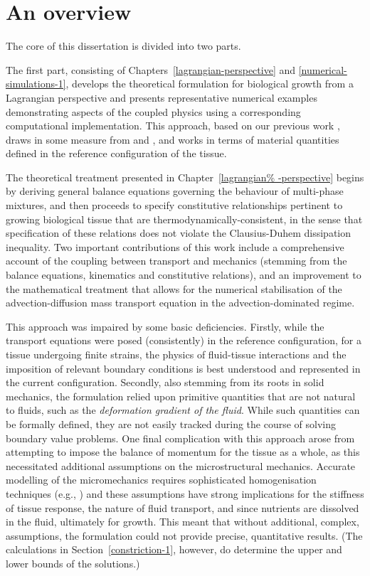 \section{An overview}
\label{overview}

The core of this dissertation is divided into two parts.

The first part, consisting of Chapters~\ref{lagrangian-perspective}
and \ref{numerical-simulations-1}, develops the theoretical
formulation for biological growth from a Lagrangian perspective and
presents representative numerical examples demonstrating aspects of
the coupled physics using a corresponding computational
implementation. This approach, based on our previous work
\citep{growthpaper}, draws in some measure from
\citet{CowinHegedus:76, EpsteinMaugin:2000} and
\citet{TaberHumphrey:2001}, and works in terms of material quantities
defined in the reference configuration of the tissue.

The theoretical treatment presented in Chapter~\ref{lagrangian%
  -perspective} begins by deriving general balance equations governing
the behaviour of multi-phase mixtures, and then proceeds to specify
constitutive relationships pertinent to growing biological tissue that
are thermody\-namically-consistent, in the sense that specification of
these relations does not violate the Clausius-Duhem dissipation
inequality. Two important contributions of this work include a
comprehensive account of the coupling between transport and mechanics
(stemming from the balance equations, kinematics and constitutive
relations), and an improvement to the mathematical treatment that
allows for the numerical stabilisation of the advection-diffusion mass
transport equation in the advection-dominated regime.

This approach was impaired by some basic deficiencies. Firstly, while
the transport equations were posed (consistently) in the reference
configuration, for a tissue undergoing finite strains, the physics of
fluid-tissue interactions and the imposition of relevant boundary
conditions is best understood and represented in the current
configuration.  Secondly, also stemming from its roots in solid
mechanics, the formulation relied upon primitive quantities that are
not natural to fluids, such as the {\em deformation gradient of the
  fluid}. While such quantities can be formally defined, they are not
easily tracked during the course of solving boundary value
problems. One final complication with this approach arose from
attempting to impose the balance of momentum for the tissue as a
whole, as this necessitated additional assumptions on the
microstructural mechanics. Accurate modelling of the micromechanics
requires sophisticated homogenisation techniques (e.g., \citet{%
  IdiartCastaneda:2003}) and these assumptions have strong
implications for the stiffness of tissue response, the nature of fluid
transport, and since nutrients are dissolved in the fluid, ultimately
for growth. This meant that without additional, complex, assumptions,
the formulation could not provide precise, quantitative results. (The
calculations in Section~\ref{constriction-1}, however, do determine
the upper and lower bounds of the solutions.)

